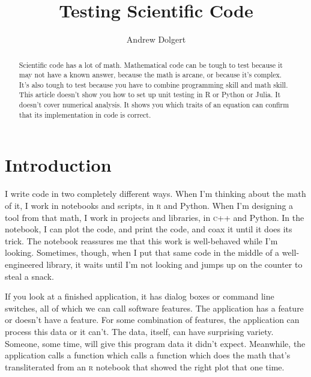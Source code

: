 \documentclass[fleqn,10pt]{olplainarticle}
\title{Testing Scientific Code}
\author[1]{Andrew Dolgert}
\affil[1]{IHME, University of Washington}
\newcommand{\rlang}{\textsc{r}\xspace}
\newcommand{\cpp}{\textsc{c}++\xspace}
\begin{document}

\begin{abstract}
Scientific code has a lot of math. Mathematical code can be tough to test
because it may not have a known answer, because the math is arcane, or because
it's complex. It's also tough to test because you have to combine programming
skill and math skill. This article doesn't show you how to set up unit testing
in R or Python or Julia. It doesn't cover numerical analysis. It shows you which
traits of an equation can confirm that its implementation in code is correct.
\end{abstract}


\flushbottom
\maketitle
\thispagestyle{empty}

\tableofcontents
\section{Introduction}\label{sec:introduction}

I write code in two completely different ways. When I'm thinking about the math of it,
I work in notebooks and scripts, in \rlang and Python. When I'm designing a tool
from that math, I work in projects and libraries, in \cpp and Python.
In the notebook, I can plot the code, and print the code, and coax it until it does
its trick. The notebook reassures me that this work is well-behaved while
I'm looking. Sometimes, though, when I put that same code in the middle of a well-engineered
library, it waits until I'm not looking and jumps up on the counter to steal a snack.

If you look at a finished application, it has dialog boxes or command line switches,
all of which we can call software features. The application has a feature or doesn't
have a feature. For some combination of features, the application can process this data or it can't.
The data, itself, can have surprising variety. Someone, some time, will give this program
data it didn't expect. Meanwhile, the application calls a function which calls a function
which does the math that's transliterated from an \rlang notebook that showed the
right plot that one time.
\end{document}

